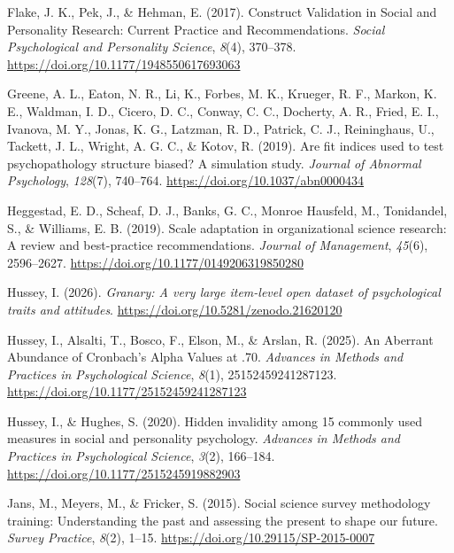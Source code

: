 \documentclass[
  nonatbib,
  authoryear,
  preprint]{elsarticle}
\newlength{\cslhangindent}
\newenvironment{CSLReferences}[2] %
 {\begin{list}{}{%
  \setlength{\itemindent}{0pt}
  \setlength{\leftmargin}{0pt}
  \setlength{\parsep}{0pt}
  \ifodd #1
   \setlength{\leftmargin}{\cslhangindent}
   \setlength{\itemindent}{-1\cslhangindent}
  \fi
  \setlength{\itemsep}{#2\baselineskip}}}
 {\end{list}}
\begin{document}
\begin{CSLReferences}{1}{0}
Flake, J. K., Pek, J., \& Hehman, E. (2017). Construct {Validation} in
{Social} and {Personality} {Research}: {Current} {Practice} and
{Recommendations}. \emph{Social Psychological and Personality Science},
\emph{8}(4), 370--378. \url{https://doi.org/10.1177/1948550617693063}

Greene, A. L., Eaton, N. R., Li, K., Forbes, M. K., Krueger, R. F.,
Markon, K. E., Waldman, I. D., Cicero, D. C., Conway, C. C., Docherty,
A. R., Fried, E. I., Ivanova, M. Y., Jonas, K. G., Latzman, R. D.,
Patrick, C. J., Reininghaus, U., Tackett, J. L., Wright, A. G. C., \&
Kotov, R. (2019). Are fit indices used to test psychopathology structure
biased? {A} simulation study. \emph{Journal of Abnormal Psychology},
\emph{128}(7), 740--764. \url{https://doi.org/10.1037/abn0000434}

Heggestad, E. D., Scheaf, D. J., Banks, G. C., Monroe Hausfeld, M.,
Tonidandel, S., \& Williams, E. B. (2019). Scale adaptation in
organizational science research: {A} review and best-practice
recommendations. \emph{Journal of Management}, \emph{45}(6), 2596--2627.
\url{https://doi.org/10.1177/0149206319850280}

Hussey, I. (2026). \emph{Granary: {A} very large item-level open dataset
of psychological traits and attitudes}.
\url{https://doi.org/10.5281/zenodo.21620120}

Hussey, I., Alsalti, T., Bosco, F., Elson, M., \& Arslan, R. (2025). An
{Aberrant} {Abundance} of {Cronbach}'s {Alpha} {Values} at .70.
\emph{Advances in Methods and Practices in Psychological Science},
\emph{8}(1), 25152459241287123.
\url{https://doi.org/10.1177/25152459241287123}

Hussey, I., \& Hughes, S. (2020). Hidden invalidity among 15 commonly
used measures in social and personality psychology. \emph{Advances in
Methods and Practices in Psychological Science}, \emph{3}(2), 166--184.
\url{https://doi.org/10.1177/2515245919882903}

Jans, M., Meyers, M., \& Fricker, S. (2015). Social science survey
methodology training: {Understanding} the past and assessing the present
to shape our future. \emph{Survey Practice}, \emph{8}(2), 1--15.
\url{https://doi.org/10.29115/SP-2015-0007}


\end{CSLReferences}
\end{document}
